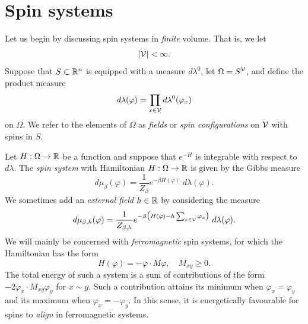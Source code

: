 
\section{Spin systems}
\label{sec:spins}

Let us begin by discussing spin systems in \emph{finite} volume. That is, we
let
\begin{equation}
|\mathcal{V}| < \infty.
\end{equation}
Suppose that $S \subset {\mathbb R}^n$ is equipped with a measure $d\lambda^0$, let
$\Omega = S^{\mathcal{V}}$, and define the product measure
\begin{equation}
d\lambda(\varphi) = \prod_{x\in\mathcal{V}} d\lambda^0(\varphi_x)
\end{equation}
on $\Omega$. We refer to the elements of $\Omega$ as \emph{fields}
or \emph{spin configurations} on $\mathcal{V}$ with spins in $S$.

Let $H : \Omega \rightarrow {\mathbb R}$ be a function and suppose
that $e^{-H}$ is integrable with respect to $d\lambda$.
The \emph{spin system} with Hamiltonian $H : \Omega \rightarrow {\mathbb R}$ is given
by the Gibbs measure
\begin{equation}
\label{e:gibbs-spin}
d\mu_\beta(\varphi)
	=
\frac{1}{Z_\beta} e^{-\beta H(\varphi)} \; d\lambda(\varphi).
\end{equation}
We sometimes add an \emph{external field} $h \in {\mathbb R}$ by considering the measure
\begin{equation}
\label{e:gibbs-spin-ext}
d\mu_{\beta,h}(\varphi)
	=
\frac{1}{Z_{\beta,h}}
e^{-\beta \big(H(\varphi) - h \sum_{x\in\mathcal{V}} \varphi_x\big)} \; d\lambda(\varphi).
\end{equation}
We will mainly be concerned with \emph{ferromagnetic} spin systems, for which the
Hamiltonian has the form
\begin{equation}
H(\varphi) = -\varphi \cdot M\varphi,
	\quad
M_{xy} \ge 0.
\end{equation}
The total energy of such a system is a sum of contributions
of the form $-2 \varphi_x \cdot M_{xy} \varphi_y$ for $x \sim y$. Such a
contribution
attains its minimum when $\varphi_x = \varphi_y$ and its maximum when
$\varphi_x = -\varphi_y$. In this sense, it is energetically favourable
for spins to \emph{align} in ferromagnetic systems.

